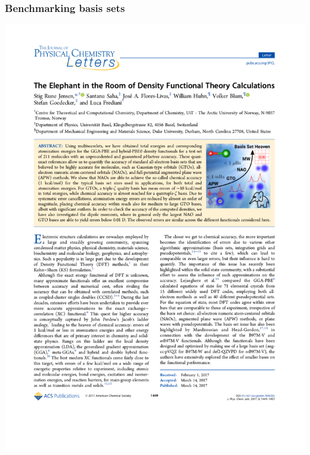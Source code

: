 \begin{frame}
    \frametitle{Benchmarking basis sets}

    \begin{center}
        \includegraphics[scale=0.60, clip, viewport = 50 675 550 820]{figures/elephant_room.pdf}
    \end{center}


\end{frame}
